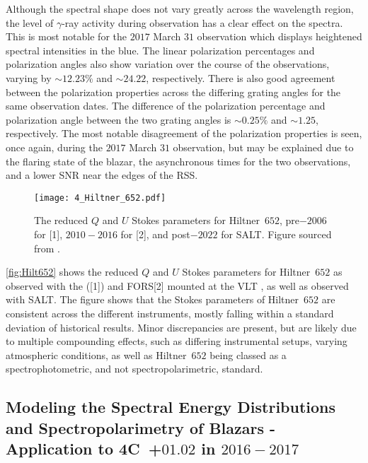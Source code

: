 Although the spectral shape does not vary greatly across the wavelength region, the level of $\gamma$-ray activity during observation has a clear effect on the spectra.
This is most notable for the $2017$ March $31$ observation which displays heightened spectral intensities in the blue.
The linear polarization percentages and polarization angles also show variation over the course of the observations, varying by $\sim 12.23\%$ and $\sim 24.22$\degree, respectively.
There is also good agreement between the polarization properties across the differing grating angles for the same observation dates.
The difference of the polarization percentage and polarization angle between the two grating angles is $\sim 0.25\%$ and $\sim 1.25$\degree, respectively.
The most notable disagreement of the polarization properties is seen, once again, during the $2017$ March $31$ observation, but may be explained due to the flaring state of the blazar, the asynchronous times for the two observations, and a lower \gls{SNR} near the edges of the \gls{RSS}.

\begin{figure}[t]
    \centering
    \texttt{[image: 4\_Hiltner\_652.pdf]}
    \caption{The reduced $Q$ and $U$ Stokes parameters for Hiltner~$652$, pre$-2006$ for [1], $2010 - 2016$ for [2], and post$-2022$ for \gls{SALT}. Figure sourced from \citep{Cooper_HEASA2022}.}
    \label{fig:Hilt652}
\end{figure}

\autoref{fig:Hilt652} shows the reduced $Q$ and $U$ Stokes parameters for Hiltner~$652$ as observed with the  ([1]) and \gls{FORS}[2] mounted at the \gls{VLT} \citep{FORS1, FORS2}, as well as observed with \gls{SALT}.
The figure shows that the Stokes parameters of Hiltner~$652$ are consistent across the different instruments, mostly falling within a standard deviation of historical results.
Minor discrepancies are present, but are likely due to multiple compounding effects, such as differing instrumental setups, varying atmospheric conditions, as well as Hiltner~$652$ being classed as a spectrophotometric, and not spectropolarimetric, standard.

\subsection[Modeling the Spectral Energy Distributions and Spectropolarimetry of Blazars - Application to 4C~+01.02 in 2016 - 2017]{%
    Modeling the Spectral Energy Distributions and Spectro\-polari\-metry of Blazars - Application to 4C~+$01.02$ in $2016 - 2017$\\
    \citep{Schutte4C0102}
}

